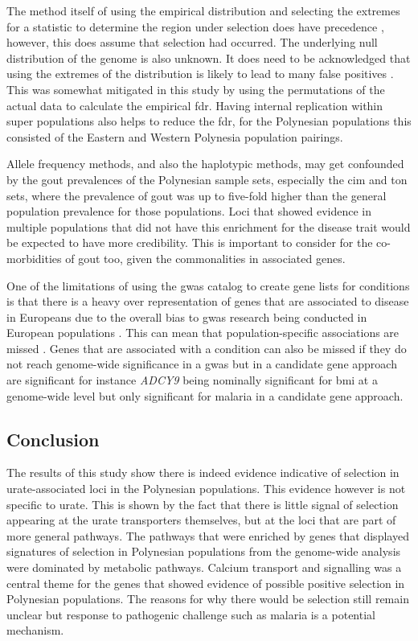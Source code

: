 \documentclass[]{report}
\begin{document}
The method itself of using the empirical distribution and selecting the
extremes for a statistic to determine the region under selection does
have precedence \citep{voight2006map, Hider2013, Jonnalagadda2017},
however, this does assume that selection had occurred. The underlying
null distribution of the genome is also unknown. It does need to be
acknowledged that using the extremes of the distribution is likely to
lead to many false positives \citep{Teshima2006}. This was somewhat
mitigated in this study by using the permutations of the actual data to
calculate the empirical \gls{fdr}. Having internal replication within
super populations also helps to reduce the \gls{fdr}, for the Polynesian
populations this consisted of the Eastern and Western Polynesia
population pairings.

Allele frequency methods, and also the haplotypic methods, may get
confounded by the gout prevalences of the Polynesian sample sets,
especially the \gls{cim} and \gls{ton} sets, where the prevalence of
gout was up to five-fold higher than the general population prevalence
for those populations. Loci that showed evidence in multiple populations
that did not have this enrichment for the disease trait would be
expected to have more credibility. This is important to consider for the
co-morbidities of gout too, given the commonalities in associated genes.

One of the limitations of using the \gls{gwas} catalog to create gene
lists for conditions is that there is a heavy over representation of
genes that are associated to disease in Europeans due to the overall
bias to \gls{gwas} research being conducted in European populations
\citep{Haga2010, Popejoy2016}. This can mean that population-specific
associations are missed \citep{Weissglas-Volkov2013, Minster2016}. Genes
that are associated with a condition can also be missed if they do not
reach genome-wide significance in a \gls{gwas} but in a candidate gene
approach are significant for instance \emph{ADCY9} being nominally
significant for \gls{bmi} at a genome-wide level but only significant
for malaria in a candidate gene approach.

\subsection{Conclusion}\label{conclusion}

The results of this study show there is indeed evidence indicative of
selection in urate-associated loci in the Polynesian populations. This
evidence however is not specific to urate. This is shown by the fact
that there is little signal of selection appearing at the urate
transporters themselves, but at the loci that are part of more general
pathways. The pathways that were enriched by genes that displayed
signatures of selection in Polynesian populations from the genome-wide
analysis were dominated by metabolic pathways. Calcium transport and
signalling was a central theme for the genes that showed evidence of
possible positive selection in Polynesian populations. The reasons for
why there would be selection still remain unclear but response to
pathogenic challenge such as malaria is a potential mechanism.
\end{document}
